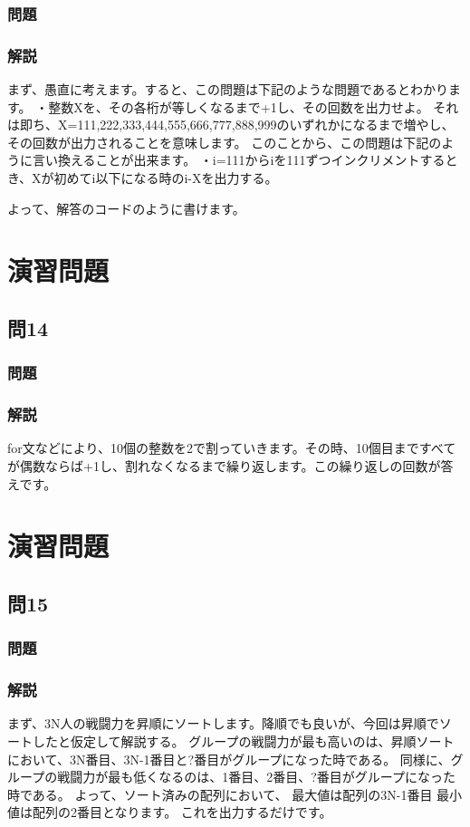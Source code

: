 \subsubsection{問題}

\subsubsection{解説}

まず、愚直に考えます。すると、この問題は下記のような問題であるとわかります。
・整数Xを、その各桁が等しくなるまで+1し、その回数を出力せよ。
それは即ち、X=111,222,333,444,555,666,777,888,999のいずれかになるまで増やし、その回数が出力されることを意味します。
このことから、この問題は下記のように言い換えることが出来ます。
・i=111からiを111ずつインクリメントするとき、Xが初めてi以下になる時のi-Xを出力する。

よって、解答のコードのように書けます。

\section{演習問題}
\subsection{問14}
\subsubsection{問題}

\subsubsection{解説}

for文などにより、10個の整数を2で割っていきます。その時、10個目まですべてが偶数ならば+1し、割れなくなるまで繰り返します。この繰り返しの回数が答えです。


\section{演習問題}
\subsection{問15}
\subsubsection{問題}

\subsubsection{解説}

まず、3N人の戦闘力を昇順にソートします。降順でも良いが、今回は昇順でソートしたと仮定して解説する。
グループの戦闘力が最も高いのは、昇順ソートにおいて、3N番目、3N-1番目と?番目がグループになった時である。
同様に、グループの戦闘力が最も低くなるのは、1番目、2番目、?番目がグループになった時である。
よって、ソート済みの配列において、
最大値は配列の3N-1番目
最小値は配列の2番目となります。
これを出力するだけです。
